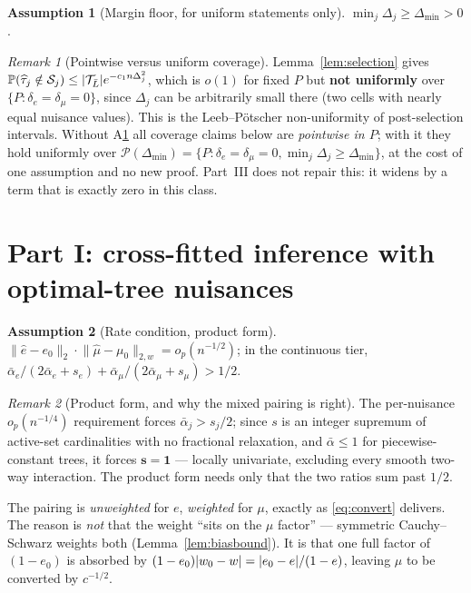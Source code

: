 \documentclass[11pt]{article}
\theoremstyle{plain}
\theoremstyle{definition}
\newtheorem{assumption}{Assumption}
\theoremstyle{remark}
\newtheorem{remark}{Remark}
\newcommand{\PP}{\mathbb{P}}
\newcommand{\cT}{\mathcal{T}}
\newcommand{\cS}{\mathcal{S}}
\newcommand{\cP}{\mathcal{P}}
\newcommand{\ez}{e_0}
\newcommand{\mz}{\mu_0}
\newcommand{\wz}{w_0}
\newcommand{\ehat}{\widehat{e}}
\newcommand{\mhat}{\widehat{\mu}}
\newcommand{\that}{\widehat{\tau}}
\newcommand{\Ltwo}[1]{\lVert #1 \rVert_{2}}
\newcommand{\Lw}[1]{\lVert #1 \rVert_{2,w}}
\DeclarePairedDelimiter{\abs}{\lvert}{\rvert}
\DeclarePairedDelimiter{\card}{\lvert}{\rvert}
\begin{document}
\begin{assumption}[Margin floor, for uniform statements only]\label{ass:margin-floor}
$\min_j\Delta_j\ge\Delta_{\min}>0$.
\end{assumption}

\begin{remark}[Pointwise versus uniform coverage]\label{rem:uniformity}
Lemma~\ref{lem:selection} gives
$\PP(\that_j\notin\cS_j)\le\card{\cT_{\bar L}}e^{-c_1n\Delta_j^2}$, which is
$o(1)$ for fixed $P$ but \textbf{not uniformly} over
$\{P:\delta_e=\delta_\mu=0\}$, since $\Delta_j$ can be arbitrarily small there
(two cells with nearly equal nuisance values). This is the Leeb--P\"otscher
non-uniformity of post-selection intervals. Without A\ref{ass:margin-floor} all
coverage claims below are \emph{pointwise in $P$}; with it they hold uniformly
over $\cP(\Delta_{\min})=\{P:\delta_e=\delta_\mu=0,\min_j\Delta_j\ge\Delta_{\min}\}$,
at the cost of one assumption and no new proof. Part~III does not repair this: it
widens by a term that is exactly zero in this class.
\end{remark}

\section{Part I: cross-fitted inference with optimal-tree nuisances}

\begin{assumption}[Rate condition, product form]\label{ass:rate}
$\Ltwo{\ehat-\ez}\cdot\Lw{\mhat-\mz}=o_p(n^{-1/2})$; in the continuous tier,
$\bar\alpha_e/(2\bar\alpha_e+s_e)+\bar\alpha_\mu/(2\bar\alpha_\mu+s_\mu)>1/2$.
\end{assumption}

\begin{remark}[Product form, and why the mixed pairing is right]\label{rem:product}
The per-nuisance $o_p(n^{-1/4})$ requirement forces $\bar\alpha_j>s_j/2$; since
$s$ is an integer supremum of active-set cardinalities with no fractional
relaxation, and $\bar\alpha\le1$ for piecewise-constant trees, it forces
$\boldsymbol{s=1}$ --- locally univariate, excluding every smooth two-way
interaction. The product form needs only that the two ratios sum past $1/2$.

The pairing is \emph{unweighted} for $e$, \emph{weighted} for $\mu$, exactly as
\eqref{eq:convert} delivers. The reason is \emph{not} that the weight ``sits on
the $\mu$ factor'' --- symmetric Cauchy--Schwarz weights both
(Lemma~\ref{lem:biasbound}). It is that one full factor of $(1-\ez)$ is absorbed
by $(1-\ez)\abs{\wz-w}=\abs{\ez-e}/(1-e)$, leaving $\mu$ to be converted by
$c^{-1/2}$.
\end{remark}
\end{document}
